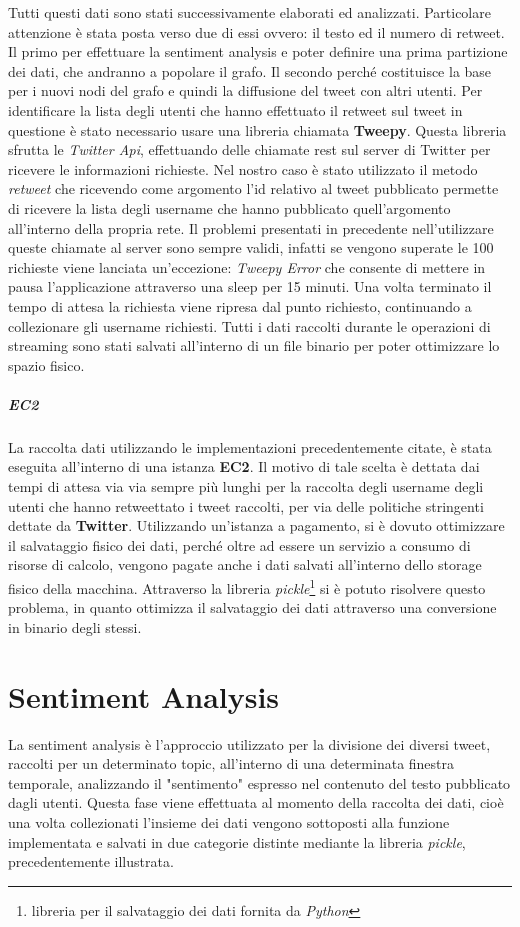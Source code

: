 Tutti questi dati sono stati successivamente elaborati ed analizzati. Particolare attenzione è stata posta verso due di essi ovvero: il testo ed il numero di retweet. 
Il primo per effettuare la sentiment analysis e poter definire una prima partizione dei dati, che andranno a popolare il grafo.
Il secondo perché costituisce la base per i nuovi nodi del grafo e quindi la diffusione del tweet con altri utenti. 
Per identificare la lista degli utenti che hanno effettuato il retweet sul tweet in questione è stato necessario usare una libreria chiamata \textbf{Tweepy}.
Questa libreria sfrutta le \textit{Twitter Api}, effettuando delle chiamate rest sul server di Twitter per ricevere le informazioni richieste. Nel nostro caso è stato utilizzato il metodo \textit{retweet} che ricevendo come argomento l'id relativo al tweet pubblicato permette di ricevere la lista degli username che hanno pubblicato quell'argomento all'interno della propria rete. Il problemi presentati in precedente nell'utilizzare queste chiamate al server sono sempre validi, infatti se vengono superate le 100 richieste viene lanciata un'eccezione: \textit{Tweepy Error} che consente di mettere in pausa l'applicazione attraverso una sleep per 15 minuti. Una volta terminato il tempo di attesa la richiesta viene ripresa dal punto richiesto, continuando a collezionare gli username richiesti.
Tutti i dati raccolti durante le operazioni di streaming sono stati salvati all'interno di un file binario per poter ottimizzare lo spazio fisico.

\subparagraph{EC2}
La raccolta dati utilizzando le implementazioni precedentemente citate, è stata eseguita all'interno di una istanza \textbf{EC2}. 
Il motivo di tale scelta è dettata dai tempi di attesa via via sempre più lunghi per la raccolta degli username degli utenti che hanno retweettato i tweet raccolti, per via delle politiche stringenti dettate da \textbf{Twitter}.  Utilizzando un'istanza a pagamento, si è dovuto ottimizzare il salvataggio fisico dei dati, perché oltre ad essere un servizio a consumo di risorse di calcolo, vengono pagate anche i dati salvati all'interno dello storage fisico della macchina. Attraverso la libreria \textit{pickle}\footnote{libreria per il salvataggio dei dati fornita da \textit{Python}} si è potuto risolvere questo problema, in quanto ottimizza il salvataggio dei dati attraverso una conversione in binario degli stessi.


\section{Sentiment Analysis}
\label{Sentiment}
La sentiment analysis è l'approccio utilizzato per la divisione dei diversi tweet, raccolti per un determinato topic, all'interno di una determinata finestra temporale, analizzando il "sentimento" espresso nel contenuto del testo pubblicato dagli utenti.
Questa fase viene effettuata al momento della raccolta dei dati, cioè una volta collezionati l'insieme dei dati vengono sottoposti alla funzione implementata e salvati in due categorie distinte mediante la libreria \textit{pickle}, precedentemente illustrata.

